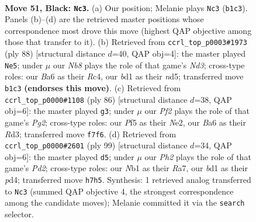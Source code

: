 \documentclass[11pt]{article}
\begin{document}
\clearpage

\begin{figure}[p]\centering
\begin{subfigure}{0.46\textwidth}\centering
\resizebox{\linewidth}{!}{%
\newchessgame
\chessboard[
  setfen={6k1/2r2p1p/b5p1/4Pp2/5P2/7N/P4KPP/1n1B4 b - - 11 51},
  showmover=false,
  pgfstyle=straightmove, color=movearrow, markmove={b1-c3}
]}
\caption{}
\end{subfigure}\hfill
\begin{subfigure}{0.46\textwidth}\centering
\resizebox{\linewidth}{!}{%
\newchessgame
\chessboard[
  setfen={r3k3/5pp1/4p2p/2Pn3P/2R5/3N2P1/5PK1/8 w - - 1 45},
  showmover=false,
  pgfstyle=straightmove, color=movearrow, markmove={d3-e5}
]}
\caption{}
\end{subfigure}
\\[4pt]
\begin{subfigure}{0.46\textwidth}\centering
\resizebox{\linewidth}{!}{%
\newchessgame
\chessboard[
  setfen={8/2r2pk1/4n3/6pp/4P3/3R1P1P/4N1P1/5K2 w - - 0 44},
  showmover=false,
  pgfstyle=straightmove, color=movearrow, markmove={g2-g3}
]}
\caption{}
\end{subfigure}\hfill
\begin{subfigure}{0.46\textwidth}\centering
\resizebox{\linewidth}{!}{%
\newchessgame
\chessboard[
  setfen={8/r1bpkp2/4p3/5p2/3P3P/4P2P/1R3PK1/4N3 b - - 2 50},
  showmover=false,
  pgfstyle=straightmove, color=movearrow, markmove={d7-d5}
]}
\caption{}
\end{subfigure}
\caption{\textbf{Move 51, Black: \texttt{Nc3}.} (a) Our position; Melanie plays \texttt{Nc3} (\texttt{b1c3}). Panels (b)--(d) are the retrieved master positions whose correspondence most drove this move (highest QAP objective among those that transfer to it). (b) Retrieved from \texttt{ccrl\_top\_p0003\#1973} (ply 88) [structural distance $d$=40, QAP obj=4]: the master played \texttt{Ne5}; under $\mu$ our \emph{Nb8} plays the role of that game's \emph{Nd3}; cross-type roles: our \emph{B}a6 as their \emph{R}c4, our \emph{b}d1 as their \emph{n}d5; transferred move \texttt{b1c3} \textbf{(endorses this move)}. (c) Retrieved from \texttt{ccrl\_top\_p0000\#1108} (ply 86) [structural distance $d$=38, QAP obj=6]: the master played \texttt{g3}; under $\mu$ our \emph{Pf2} plays the role of that game's \emph{Pg2}; cross-type roles: our \emph{P}f5 as their \emph{N}e2, our \emph{B}a6 as their \emph{R}d3; transferred move \texttt{f7f6}. (d) Retrieved from \texttt{ccrl\_top\_p0000\#2601} (ply 99) [structural distance $d$=34, QAP obj=6]: the master played \texttt{d5}; under $\mu$ our \emph{Ph2} plays the role of that game's \emph{Pd2}; cross-type roles: our \emph{N}b1 as their \emph{R}a7, our \emph{b}d1 as their \emph{p}d4; transferred move \texttt{h7h5}. Synthesis: 1 retrieved analog transferred to \texttt{Nc3} (summed QAP objective 4, the strongest correspondence among the candidate moves); Melanie committed it via the \texttt{search} selector.}
\label{fig:thought-m101}
\end{figure}
\end{document}
